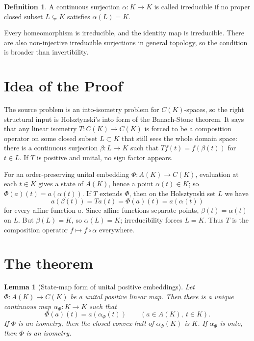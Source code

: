 \documentclass[11pt]{amsart}
\newtheorem{lemma}{Lemma}
\theoremstyle{definition}
\newtheorem{definition}{Definition}
\begin{document}
\begin{definition}
A continuous surjection \(\alpha:K\to K\) is called irreducible if no proper
closed subset \(L\subsetneq K\) satisfies \(\alpha(L)=K\).
\end{definition}

Every homeomorphism is irreducible, and the identity map is irreducible.
There are also non-injective irreducible surjections in general topology, so
the condition is broader than invertibility.

\section*{Idea of the Proof}
The source problem is an into-isometry problem for \(C(K)\)-spaces, so the
right structural input is Holsztynski's into form of the Banach-Stone theorem.
It says that any linear isometry \(T:C(K)\to C(K)\) is forced to be a
composition operator on some closed subset \(L\subset K\) that still sees the
whole domain space: there is a continuous surjection \(\beta:L\to K\) such
that \(Tf(t)=f(\beta(t))\) for \(t\in L\).  If \(T\) is positive and unital, no
sign factor appears.

For an order-preserving unital embedding \(\Phi:A(K)\to C(K)\), evaluation at
each \(t\in K\) gives a state of \(A(K)\), hence a point \(\alpha(t)\in K\);
so \(\Phi(a)(t)=a(\alpha(t))\).  If \(T\) extends \(\Phi\), then on the
Holsztynski set \(L\) we have
\[
  a(\beta(t))=Ta(t)=\Phi(a)(t)=a(\alpha(t))
\]
for every affine function \(a\).  Since affine functions separate points,
\(\beta(t)=\alpha(t)\) on \(L\).  But \(\beta(L)=K\), so
\(\alpha(L)=K\); irreducibility forces \(L=K\).  Thus \(T\) is the composition
operator \(f\mapsto f\circ \alpha\) everywhere.

\section*{The theorem}
\begin{lemma}[State-map form of unital positive embeddings]
Let \(\Phi:A(K)\to C(K)\) be a unital positive linear map.  Then there is a
unique continuous map \(\alpha_\Phi:K\to K\) such that
\[
  \Phi(a)(t)=a(\alpha_\Phi(t))\qquad(a\in A(K),\ t\in K).
\]
If \(\Phi\) is an isometry, then the closed convex hull of
\(\alpha_\Phi(K)\) is \(K\).  If \(\alpha_\Phi\) is onto, then \(\Phi\) is an
isometry.
\end{lemma}
\end{document}
